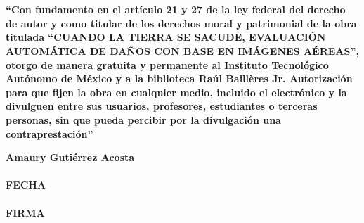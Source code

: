 \begin{titlepage}

\hfill\\
\hfill\\


\vspace{4cm}

\textbf{ ``Con fundamento en el art\'iculo 21 y 27 de la ley federal del derecho de autor y como titular de los derechos moral y patrimonial de la obra titulada ``CUANDO LA TIERRA SE SACUDE, EVALUACI\'ON AUTOM\'ATICA DE DA\~NOS CON BASE EN IM\'AGENES A\'EREAS'', otorgo de manera gratuita y permanente al Instituto Tecnol\'ogico Aut\'onomo de M\'exico y a la biblioteca Ra\'ul Baill\`eres Jr. Autorizaci\'on para que fijen la obra en cualquier medio, incluido el electr\'onico y la divulguen entre sus usuarios, profesores, estudiantes o terceras personas, sin que pueda percibir por la divulgaci\'on una contraprestaci\'on''}

\vspace{1cm}
\begin{center}
\textbf{Amaury Guti\'errez Acosta}\\
\makebox[2in]{\hrulefill}\\
\textbf{FECHA}\\
\makebox[2in]{\hrulefill}\\
\textbf{FIRMA}\\
\end{center}
\medskip




\end{titlepage}
\endinput